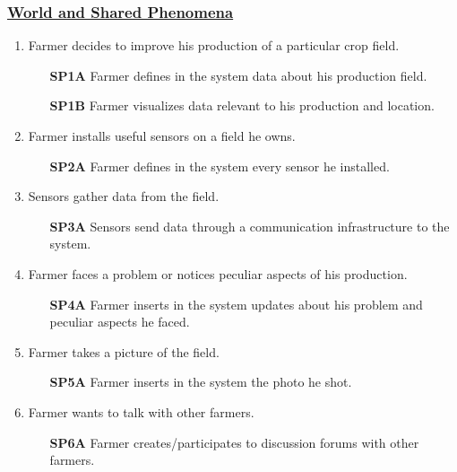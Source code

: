 	\subsubsection[World and Shared Phenomena]{\hyperlink{toc}{World and Shared Phenomena}}
		\label{sec:wsphenomena}
		\begin{enumerate}[label=\textbf{WP\arabic*}]
			\item \label{wp:WP1} Farmer decides to improve his production of a particular crop field.
				\begin{enumerate}
					\item [\textbf{SP1A}] Farmer defines in the system data about his production field.
					\item [\textbf{SP1B}] Farmer visualizes data relevant to his production and location.
				\end{enumerate}
			\item \label{wp:WP2} Farmer installs useful sensors on a field he owns.
				\begin{enumerate}
					\item [\textbf{SP2A}] Farmer defines in the system every sensor he installed.
				\end{enumerate}
			\item \label{wp:WP3} Sensors gather data from the field.
				\begin{enumerate}
					\item [\textbf{SP3A}] Sensors send data through a communication infrastructure to the system.
				\end{enumerate}
			\item \label{wp:WP4} Farmer faces a problem or notices peculiar aspects of his production.
				\begin{enumerate}
					\item [\textbf{SP4A}] Farmer inserts in the system updates about his problem and peculiar aspects he faced.
				\end{enumerate}
			\item \label{wp:WP5} Farmer takes a picture of the field.
				\begin{enumerate}
					\item [\textbf{SP5A}] Farmer inserts in the system the photo he shot.
				\end{enumerate}
			\item \label{wp:WP6} Farmer wants to talk with other farmers.
				\begin{enumerate}
					\item [\textbf{SP6A}] Farmer creates/participates to discussion forums with other farmers.

\end{enumerate}
\end{enumerate}
